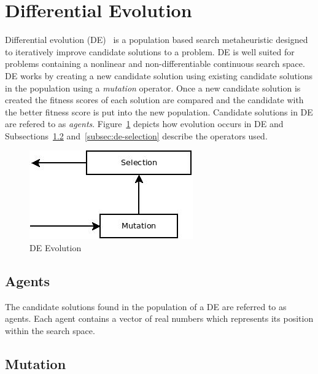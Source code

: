 \section{Differential Evolution}
\label{sec:de}

Differential evolution (DE)~\cite{storn1997differential} is a population based search metaheuristic designed to iteratively improve candidate solutions to a problem. DE is well suited for problems containing a nonlinear and non-differentiable continuous search space. DE works by creating a new candidate solution using existing candidate solutions in the population using a \textit{mutation} operator. Once a new candidate solution is created the fitness scores of each solution are compared and the candidate with the better fitness score is put into the new population. Candidate solutions in DE are refered to as \textit{agents}. Figure~\ref{fig:deFlowchart} depicts how evolution occurs in DE and Subsections~\ref{subsec:de-mutation} and~\ref{subsec:de-selection} describe the operators used.

\begin{figure}[H]
  \centering
  \includegraphics[bb=0 0 266 144,scale=0.5]{figures/DE.jpeg}
  \caption{DE Evolution}
  \label{fig:deFlowchart}
\end{figure}

\subsection{Agents}

The candidate solutions found in the population of a DE are referred to as agents. Each agent contains a vector of real numbers which represents its position within the search space.

\subsection{Mutation}
\label{subsec:de-mutation}

